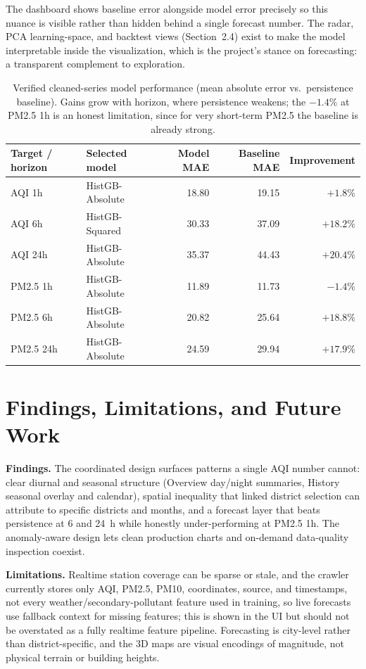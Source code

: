 \documentclass[a4paper]{article}
\begin{document}
\noindent The dashboard shows baseline error alongside model error precisely so this nuance is visible rather than
hidden behind a single forecast number. The radar, PCA learning-space, and backtest views (Section~2.4)
exist to make the model interpretable inside the visualization, which is the project's stance on
forecasting: a transparent complement to exploration.

\begin{table}[h]
\centering
\small
\begin{tabular}{@{}llrrr@{}}
\toprule
Target / horizon & Selected model & Model MAE & Baseline MAE & Improvement \\
\midrule
AQI 1h    & HistGB-Absolute & 18.80 & 19.15 & $+1.8\%$ \\
AQI 6h    & HistGB-Squared  & 30.33 & 37.09 & $+18.2\%$ \\
AQI 24h   & HistGB-Absolute & 35.37 & 44.43 & $+20.4\%$ \\
PM2.5 1h  & HistGB-Absolute & 11.89 & 11.73 & $-1.4\%$ \\
PM2.5 6h  & HistGB-Absolute & 20.82 & 25.64 & $+18.8\%$ \\
PM2.5 24h & HistGB-Absolute & 24.59 & 29.94 & $+17.9\%$ \\
\bottomrule
\end{tabular}
\caption{Verified cleaned-series model performance (mean absolute error vs.\ persistence baseline). Gains
grow with horizon, where persistence weakens; the $-1.4\%$ at PM2.5 1h is an honest limitation, since for
very short-term PM2.5 the baseline is already strong.}
\label{tab:model}
\end{table}

\section{Findings, Limitations, and Future Work}
\noindent \textbf{Findings.} The coordinated design surfaces patterns a single AQI number cannot: clear diurnal and
seasonal structure (Overview day/night summaries, History seasonal overlay and calendar), spatial
inequality that linked district selection can attribute to specific districts and months, and a forecast
layer that beats persistence at 6 and 24~h while honestly under-performing at PM2.5 1h. The anomaly-aware
design lets clean production charts and on-demand data-quality inspection coexist.

\noindent \textbf{Limitations.} Realtime station coverage can be sparse or stale, and the crawler currently stores
only AQI, PM2.5, PM10, coordinates, source, and timestamps, not every weather/secondary-pollutant
feature used in training, so live forecasts use fallback context for missing features; this is shown in
the UI but should not be overstated as a fully realtime feature pipeline. Forecasting is city-level rather
than district-specific, and the 3D maps are visual encodings of magnitude, not physical terrain or
building heights.
\end{document}
